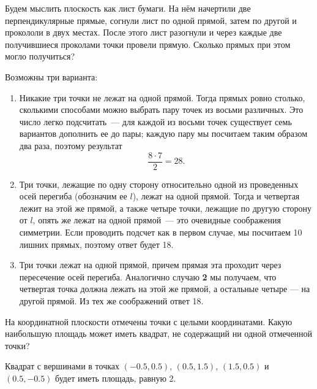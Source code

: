 

\begin{itemize}

\itB Будем мыслить плоскость как лист бумаги. На нём начертили две перпендикулярные прямые, 
согнули лист по одной прямой, затем по другой и прокололи в двух местах. После этого лист 
разогнули и через каждые две получившиеся проколами точки провели прямую. Сколько прямых при 
этом могло получиться?

\itr Возможны три варианта:

\begin{enumerate}
\item Никакие три точки не лежат на одной прямой. Тогда прямых ровно столько, сколькими 
способами можно выбрать пару точек из восьми различных. Это число легко подсчитать~--- 
для каждой из восьми точек существует семь вариантов дополнить ее до пары; каждую пару 
мы посчитаем таким образом два раза, поэтому результат
$$
\frac{8\cdot 7}{2}=28.
$$

\item Три точки, лежащие по одну сторону относительно одной из проведенных осей перегиба 
(обозначим ее $l$), лежат на одной прямой. Тогда и четвертая лежит на этой же прямой, 
а также четыре точки, лежащие по другую сторону от $l$, опять же лежат на одной прямой~--- 
это очевидные соображения симметрии. Если проводить подсчет как в первом случае, мы 
посчитаем 10 лишних прямых, поэтому ответ будет 18.

\item Три точки лежат на одной прямой, причем прямая эта проходит через пересечение осей 
перегиба. Аналогично случаю {\bfseries 2} мы получаем, что четвертая точка должна лежать на этой же 
прямой, а остальные четыре --- на другой прямой. Из тех же соображений ответ 18.
\end{enumerate}

\itC На координатной плоскости отмечены точки с целыми координатами. Какую 
наибольшую площадь может иметь квадрат, не содержащий ни одной отмеченной точки?

\itr Квадрат с вершинами в точках $(-0.5,0.5)$, $(0.5,1.5)$, $(1.5,0.5)$ и $(0.5,-0.5)$ 
будет иметь площадь, равную 2.

\begin{center}\end{center}


\end{itemize}
